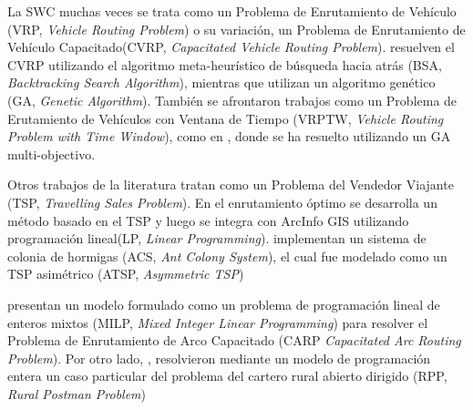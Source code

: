 
La SWC muchas veces se trata como un Problema de Enrutamiento de Vehículo (VRP, \textit{Vehicle Routing Problem}) o su variación, un Problema de Enrutamiento de Vehículo Capacitado(CVRP, \textit{Capacitated Vehicle Routing Problem}). \citet{Akhtar2017BacktrackingOptimization} resuelven el CVRP utilizando el algoritmo  meta-heurístico de búsqueda hacia atrás (BSA, \textit{Backtracking Search Algorithm}), mientras que \citet{Mohammed2017SolvingSolution} utilizan un algoritmo genético (GA, \textit{Genetic Algorithm}). También se afrontaron trabajos como un Problema de Erutamiento de Vehículos con Ventana de Tiempo (VRPTW, \textit{Vehicle Routing Problem with Time Window}), como en \citet{Ombuki-Berman2007WASTEALGORITHMS}, donde se ha resuelto utilizando un GA multi-objectivo.

Otros trabajos de la literatura tratan como un Problema del Vendedor Viajante (TSP, \textit{Travelling Sales Problem}). En \citet{Billa2014GISOptimization} el enrutamiento óptimo se desarrolla un método basado en el TSP y luego se integra con ArcInfo GIS utilizando programación lineal(LP, \textit{Linear Programming}). \citet{Karadimas2007OptimalAlgorithm} implementan un sistema de colonia de hormigas (ACS, \textit{Ant Colony System}), el cual fue modelado como un TSP asimétrico (ATSP, \textit{Asymmetric TSP})

\citet{Vecchi2016ACollection} presentan un modelo formulado como un problema de programación lineal de enteros mixtos (MILP, \textit{Mixed Integer Linear Programming}) para resolver el Problema de Enrutamiento de Arco Capacitado (CARP \textit{Capacitated Arc Routing Problem}). Por otro lado, \citet{Braier2017AnArgentina}, resolvieron mediante un modelo de programación entera un caso particular del problema del cartero rural abierto dirigido (RPP, \textit{Rural Postman Problem})


